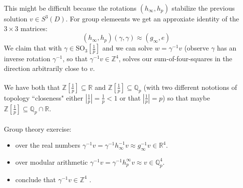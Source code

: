 \documentclass[12pt]{article}
\begin{document}
{This might be difficult because the rotations 
$(h_\infty, h_p)$ stabilize the previous solution $v \in S^3(D)$.  For group elemeents we get an approxiate identity of the $3 \times 3$ matrices:
$$ (h_\infty, h_p) (\gamma, \gamma) \approx (g_\infty, e) $$
We claim that with $\gamma \in \text{SO}_3[\frac{1}{p}]$ and we can solve $w = \gamma^{-1}v $ (observe $\gamma$ has an inverse rotation $\gamma^{-1}$, so that $\gamma^{-1}v \in \mathbb{Z}^4$, solves our sum-of-four-squares in the direction arbitrarily close to $v$. \\ \\
We have both that $\mathbb{Z}[\frac{1}{p}] \subseteq \mathbb{R}$ and $\mathbb{Z}[\frac{1}{p}] \subseteq \mathbb{Q}_p$ (with two different nototions of topology ``closeness" either $|\frac{1}{p}| = \frac{1}{p} < 1$ or that $|\frac{1}{p}| = p$) so that maybe $\mathbb{Z}[\frac{1}{p}] \subseteq \mathbb{Q}_p \cap \mathbb{R} $. \\ \\
Group theory exercise:
\begin{itemize}
\item over the real numbers $\gamma^{-1}v = \gamma^{-1} h_\infty^{-1}v \approx g_\infty^{-1} v \in \mathbb{R}^4$.
\item over modular arithmetic $\gamma^{-1}v = \gamma^{-1} h_p^\infty v \approx v \in \mathbb{Q}_p^4$.
\item conclude that $\gamma^{-1} v \in \mathbb{Z}^4$ .
\end{itemize}
}
\end{document}
